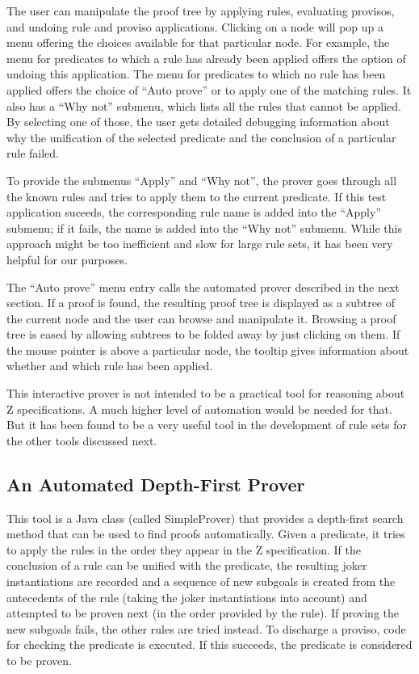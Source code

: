 \documentclass{entcs}
\begin{document}
The user can manipulate the proof tree by applying rules, evaluating
provisos, and undoing rule and proviso applications.  Clicking on a
node will pop up a menu offering the choices available for that
particular node.  For example, the menu for predicates to which a rule
has already been applied offers the option of undoing this
application.  The menu for predicates to which no rule has been
applied offers the choice of ``Auto prove'' or to apply one of the
matching rules.  It also has a ``Why not'' submenu, which lists all
the rules that cannot be applied.  By selecting one of those, the user
gets detailed debugging information about why the unification of the
selected predicate and the conclusion of a particular rule failed.

To provide the submenus ``Apply'' and ``Why not'', the prover goes
through all the known rules and tries to apply them to the current
predicate.  If this test application suceeds, the corresponding rule
name is added into the ``Apply'' submenu; if it fails, the name is
added into the ``Why not'' submenu.  While this approach might be too
inefficient and slow for large rule sets, it has been very helpful for
our purposes.

The ``Auto prove'' menu entry calls the automated prover described in
the next section.  If a proof is found, the resulting proof tree is
displayed as a subtree of the current node and the user can browse and
manipulate it.  Browsing a proof tree is eased by allowing subtrees to
be folded away by just clicking on them.  If the mouse pointer is
above a particular node, the tooltip gives information about whether
and which rule has been applied.

This interactive prover is not intended to be a practical tool for
reasoning about Z specifications.  A much higher level of automation
would be needed for that.  But it has been found to be a very useful
tool in the development of rule sets for the other tools discussed
next.

\subsection{An Automated Depth-First Prover}

This tool is a Java class (called SimpleProver) that provides a
depth-first search method that can be used to find proofs
automatically.  Given a predicate, it tries to apply the rules in the
order they appear in the Z specification.  If the conclusion of a rule
can be unified with the predicate, the resulting joker instantiations
are recorded and a sequence of new subgoals is created from the
antecedents of the rule (taking the joker instantiations into account)
and attempted to be proven next (in the order provided by the rule).
If proving the new subgoals fails, the other rules are tried instead.
To discharge a proviso, code for checking the predicate is executed.
If this succeeds, the predicate is considered to be proven.
\end{document}
